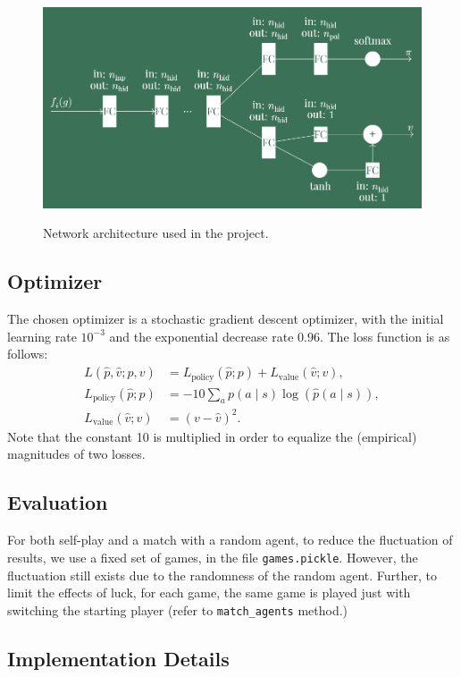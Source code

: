 \documentclass[10pt,twocolumn,letterpaper]{article}
\begin{document}
\begin{figure}[H]
   \centering
   \includegraphics[width = 0.8\linewidth]{network-architecture}
   \label{fig:network-architecture}
   \caption{Network architecture used in the project.}
\end{figure}

\subsection{Optimizer}
The chosen optimizer is a stochastic gradient descent optimizer, with the initial learning rate $10^{-3}$ and the exponential decrease rate $0.96$. The loss function is as follows:
\begin{align*}
   L(\hat p, \hat v; p, v) &= L_\text{policy}(\hat p; p) + L_\text{value}(\hat v; v),\\
   L_\text{policy}(\hat p; p) &= -10\sum_{a} p(a\mid s) \log(\hat p(a\mid s)),\\
   L_\text{value}(\hat v; v) &= (v - \hat v)^2.
\end{align*}
Note that the constant 10 is multiplied in order to equalize the (empirical) magnitudes of two losses.

\subsection{Evaluation}
For both self-play and a match with a random agent, to reduce the fluctuation of results, we use a fixed set of games, in the file \texttt{games.pickle}. However, the fluctuation still exists due to the randomness of the random agent. Further, to limit the effects of luck, for each game, the same game is played just with switching the starting player (refer to \texttt{match\_agents} method.)

\subsection{Implementation Details}
\end{document}
